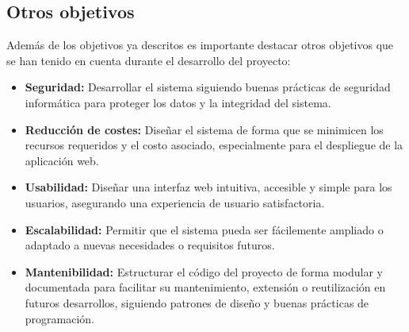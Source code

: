 \subsection{Otros objetivos}
Además de los objetivos ya descritos es importante destacar otros objetivos que se han tenido en cuenta durante el desarrollo del proyecto:
\begin{itemize}
    \item \textbf{Seguridad:} Desarrollar el sistema siguiendo buenas prácticas de seguridad informática para proteger los datos y la integridad del sistema.
    \item \textbf{Reducción de costes:} Diseñar el sistema de forma que se minimicen los recursos requeridos y el costo asociado, especialmente para el despliegue de la aplicación web.
    \item \textbf{Usabilidad:} Diseñar una interfaz web intuitiva, accesible y simple para los usuarios, asegurando una experiencia de usuario satisfactoria.
    \item \textbf{Escalabilidad:} Permitir que el sistema pueda ser fácilemente ampliado o adaptado a nuevas necesidades o requisitos futuros.
    \item \textbf{Mantenibilidad:} Estructurar el código del proyecto de forma modular y documentada para facilitar su mantenimiento, extensión o reutilización en futuros desarrollos, siguiendo patrones de diseño y buenas prácticas de programación.
\end{itemize}